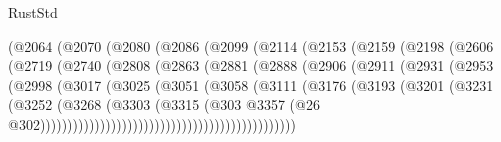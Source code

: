 \begin{lexlean}{RustStd}
\begin{coremodule}
                          (@2064
                            (@2070
                              (@2080
                                (@2086
                                  (@2099
                                    (@2114
                                      (@2153
                                        (@2159
                                          (@2198
                                            (@2606
                                              (@2719
                                                (@2740
                                                  (@2808
                                                    (@2863
                                                      (@2881
                                                        (@2888
                                                          (@2906
                                                            (@2911
                                                              (@2931
                                                                (@2953
                                                                  (@2998
                                                                    (@3017
                                                                      (@3025
                                                                        (@3051
                                                                          (@3058
                                                                            (@3111
                                                                              (@3176
                                                                                (@3193
                                                                                  (@3201
                                                                                    (@3231
                                                                                      (@3252
                                                                                        (@3268
                                                                                          (@3303
                                                                                            (@3315
                                                                                              (@303
                                                                                                @3357
                                                                                                (@26
                                                                                                  @302)))))))))))))))))))))))))))))))))))))))))))))))

\end{coremodule}
\end{lexlean}
